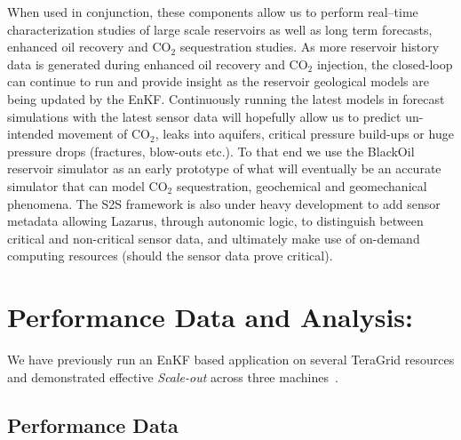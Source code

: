 \documentclass{acm_proc_article-sp}
\newcommand{\jhanote}[1]{ {\textcolor{red} { ***Jha: #1 }}}
\newcommand{\jhanote}[1]{}
\begin{document}
When used in conjunction, these components allow us to perform
real--time characterization studies of large scale reservoirs as well
as long term forecasts, enhanced oil recovery and CO$_2$ sequestration
studies. As more reservoir history data is generated during enhanced
oil recovery and CO$_2$ injection, the closed-loop can continue to run
and provide insight as the reservoir geological models are being
updated by the EnKF.  Continuously running the latest models in
forecast simulations with the latest sensor data will hopefully allow
us to predict un-intended movement of CO$_2$, leaks into aquifers,
critical pressure build-ups or huge pressure drops (fractures,
blow-outs etc.). To that end we use the BlackOil reservoir simulator
as an early prototype of what will eventually be an accurate simulator
that can model CO$_2$ sequestration, geochemical and geomechanical
phenomena. The S2S framework is also under heavy development to add
sensor metadata allowing Lazarus, through autonomic logic, to
distinguish between critical and non-critical sensor data, and
ultimately make use of on-demand computing resources (should the
sensor data prove critical).


\section{Performance Data and Analysis:} 

We have previously run an EnKF based application on several TeraGrid
resources and demonstrated effective {\it Scale-out} across three
machines~\cite{gmac}.  %

\subsection{Performance Data} 
\end{document}
